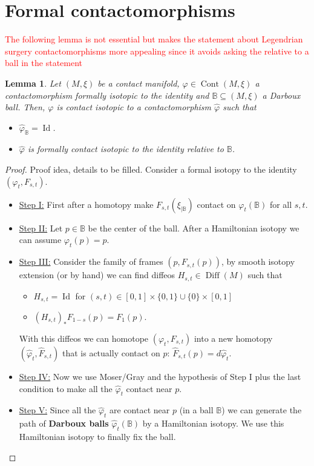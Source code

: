 \documentclass[11pt]{amsart}
\theoremstyle{plain}
\newtheorem{lemma}[theorem]{Lemma}
\theoremstyle{definition}
\theoremstyle{remark}
\numberwithin{theorem}{section}
\newcommand{\B}{{\mathbb{B}}}
\newcommand{\Diff}{\operatorname{Diff}}
\newcommand{\Id}{{\operatorname{Id}}}
\newcommand{\Cont}{\operatorname{Cont}}
\begin{document}
\section{Formal contactomorphisms}

\textcolor{red}{The following lemma is not essential but makes the statement about Legendrian surgery contactomorphisms more appealing since it avoids asking the relative to a ball in the statement}


\begin{lemma}\label{lem:FormallyTrivialRelativeBall}
    Let $(M,\xi)$ be a contact manifold, $\varphi\in \Cont(M,\xi)$ a contactomorphism formally isotopic to the identity and $\B\subseteq (M,\xi)$ a Darboux ball. Then, $\varphi$ is contact isotopic to a contactomorphism $\hat{\varphi}$ such that
    \begin{itemize}
        \item $\hat{\varphi}_{\B}=\Id$.
        \item $\hat{\varphi}$ is formally contact isotopic to the identity relative to $\B$. 
    \end{itemize}
\end{lemma}
\begin{proof}
    Proof idea, details to be filled. Consider a formal isotopy to the identity $(\varphi_t,F_{s,t})$. 
    \begin{itemize}
        \item \underline{Step I:} First after a homotopy make $F_{s,t}(\xi_{|\B})$ contact on $\varphi_t(\B)$ for all $s,t$. 
        \item \underline{ Step II:} Let $p\in \B$ be the center of the ball. After a Hamiltonian isotopy we can assume $\varphi_t(p)=p$. 
         \item \underline{ Step III:} Consider the family of frames $(p, F_{s,t}(p))$, by smooth isotopy extension (or by hand) we can find diffeos $H_{s,t}\in \Diff(M)$ such that 
    \begin{itemize}
        \item $H_{s,t}=\Id$ for $(s,t)\in [0,1]\times \{0,1\}\cup \{0\}\times [0,1]$
        \item $(H_{s,t})_{*} F_{1-s}(p)=F_1(p)$.
    \end{itemize}
    With this diffeos we can homotope $(\varphi_t,F_{s,t})$ into a new homotopy $(\hat{\varphi}_t,\hat{F}_{s,t})$ that is actually contact on $p$: $\hat{F}_{s,t}(p)=d\hat{\varphi}_t$.
    \item \underline{Step  IV:} Now we use Moser/Gray and the hypothesis of Step I plus the last condition to make all the $\hat{\varphi}_t$ contact near $p$. 
    \item \underline{Step V:} Since all the $\hat{\varphi}_t$ are contact near $p$ (in a ball $\B$) we can generate the path of \textbf{Darboux balls} $\hat{\varphi}_t(\B)$ by a Hamiltonian isotopy. We use this Hamiltonian isotopy to finally fix the ball. 
    \end{itemize}
\end{proof}
\end{document}
